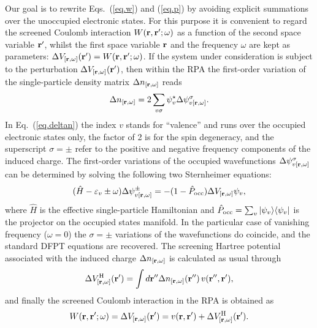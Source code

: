 \documentclass[twocolumn,prb,showpacs,superscriptaddress]{revtex4}
\def\s1{\hspace{0.5cm}}
\def\s2{\hspace{1cm}}
\def\w{\omega}
\def\H{\hat{H}}
\def\P{\hat{P}_{\rm occ}}
\def\E{\varepsilon}
\def\s{\sigma}
\def\r{{\bf r}}
\def\rp{{\bf r^\prime}}
\def\rpp{{\bf r^{\prime\prime}}}
\begin{document}
Our goal is to rewrite Eqs.\ (\ref{eq.w}) and (\ref{eq.p})
by avoiding explicit summations over the unoccupied electronic states.
For this purpose it is convenient to regard the screened Coulomb interaction
$W(\r,\rp;\w)$ as a function of the 
second space variable $\rp$, whilst the first space variable 
$\r$ and the frequency $\w$ are kept as parameters: $\Delta V_{[\r,\w]}(\rp) = W(\r,\rp;\w)$.
If the system under consideration is subject to the perturbation
$\Delta V_{[\r,\w]}(\rp)$, then within the RPA the first-order variation 
of the single-particle density matrix $\Delta n_{[\r,\w]}$ reads
  \begin{equation}\label{eq.deltan}
  \Delta n_{[\r,\w]} = 2\sum_{v\s} \psi_v^\star  \Delta \psi^\s_{v[\r,\w]}.
  \end{equation}
In Eq.\ (\ref{eq.deltan}) the index $v$ stands for ``valence'' and runs
over the occupied electronic states only, the factor of 2 is for the spin degeneracy, 
and the superscript $\sigma=\pm$ refer to the positive and negative
frequency components of the induced charge.
The first-order variations of the occupied wavefunctions $\Delta \psi^\s_{v[\r,\w]}$
can be determined by solving the following two Sternheimer equations:
  \begin{equation}\label{eq.linsys.1}
  (\H-\E_v\pm\w) \Delta \psi^\pm_{v[\r,\w]}  = -(1-\P)  \Delta V_{[\r,\w]} \psi_v, 
  \end{equation}
where $\H$ is the effective single-particle Hamiltonian and 
$\P=\sum_v |\psi_v\rangle\langle\psi_v|$ is the projector
on the occupied states manifold. 
In the particular case of vanishing frequency ($\w=0$)
the $\sigma=\pm$ variations of the wavefunctions do coincide,
and the standard DFPT equations are recovered.
The screening Hartree potential associated with the induced charge 
$\Delta n_{[\r,\w]}$ is calculated as usual through
  \begin{equation}\label{eq.dhartree}
  \Delta V^{\rm H}_{[\r,\w]}(\rp) = \int d\rpp \Delta n_{[\r,\w]} (\rpp) \, v(\rpp,\rp),
  \end{equation}
and finally the screened Coulomb interaction in the RPA is obtained as 
  \begin{equation}\label{eq.w.dfpt}
  W(\r,\rp;\w) = \Delta V_{[\r,\w]}(\rp) = v(\r,\rp) + \Delta V^{\rm H}_{[\r,\w]}(\rp).
  \end{equation}
\end{document}
